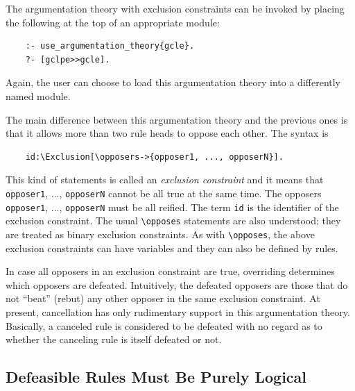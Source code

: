 \documentclass[11pt]{article}
\newcommand{\bs}{\textbackslash}
\begin{document}
The argumentation theory with exclusion constraints
can be invoked by placing the following at the
top of an appropriate module:
\begin{verbatim}
    :- use_argumentation_theory{gcle}.
    ?- [gclpe>>gcle].
\end{verbatim}
Again, the user can choose to load this argumentation theory into a
differently named module.

The main difference between this argumentation theory and the previous
ones is that it allows more than two rule heads to oppose each other.
The syntax is
\begin{verbatim}
    id:\Exclusion[\opposers->{opposer1, ..., opposerN}].
\end{verbatim}
This kind of statements is called an \emph{exclusion constraint} and it
means that {\tt opposer1}, ..., {\tt opposerN} cannot be all true    
at the same time. The opposers {\tt opposer1}, ..., {\tt opposerN} must be
all reified. The term {\tt id} is the identifier of the
exclusion constraint.
The usual {\tt \bs{}opposes} statements are also understood; they are
treated as binary exclusion constraints.
As with {\tt \bs{}opposes}, the above exclusion constraints can have variables
and they can also be defined by rules.

In case all opposers in an exclusion constraint are true, overriding
determines which opposers are defeated.  Intuitively, the defeated opposers
are those that do not ``beat'' (rebut) any other opposer in the same
exclusion constraint.  At present, cancellation has only rudimentary
support in this argumentation theory.  Basically, a canceled rule is
considered to be defeated with no regard as to whether the canceling rule
is itself defeated or not.



\subsection{Defeasible Rules Must Be Purely Logical}
\label{sec-defeasible-logical}
\end{document}
